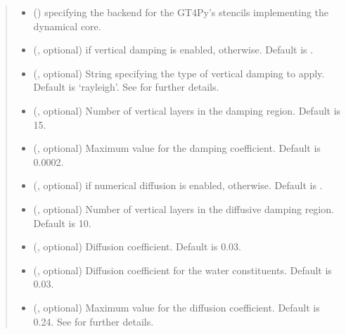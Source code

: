 \documentclass[letterpaper,10pt,english]{sphinxmanual}
\begin{document}
\begin{fulllineitems}
\begin{fulllineitems}
\begin{quote}
\begin{description}
\begin{itemize}
\item {} 
 () \textendash{}  specifying the backend for the GT4Py’s stencils implementing the dynamical core.

\item {} 
 (, optional) \textendash{}  if vertical damping is enabled,  otherwise. Default is .

\item {} 
 (, optional) \textendash{} String specifying the type of vertical damping to apply. Default is ‘rayleigh’.
See {\hyperref[\detokenize{api:dycore.vertical_damping.VerticalDamping}]{}} for further details.

\item {} 
 (, optional) \textendash{} Number of vertical layers in the damping region. Default is 15.

\item {} 
 (, optional) \textendash{} Maximum value for the damping coefficient. Default is 0.0002.

\item {} 
 (, optional) \textendash{}  if numerical diffusion is enabled,  otherwise. Default is .

\item {} 
 (, optional) \textendash{} Number of vertical layers in the diffusive damping region. Default is 10.

\item {} 
 (, optional) \textendash{} Diffusion coefficient. Default is 0.03.

\item {} 
 (, optional) \textendash{} Diffusion coefficient for the water constituents. Default is 0.03.

\item {} 
 (, optional) \textendash{} Maximum value for the diffusion coefficient. Default is 0.24. See {\hyperref[\detokenize{api:dycore.diffusion.Diffusion}]{}}
for further details.


\end{itemize}
\end{description}
\end{quote}
\end{fulllineitems}
\end{fulllineitems}
\end{document}

